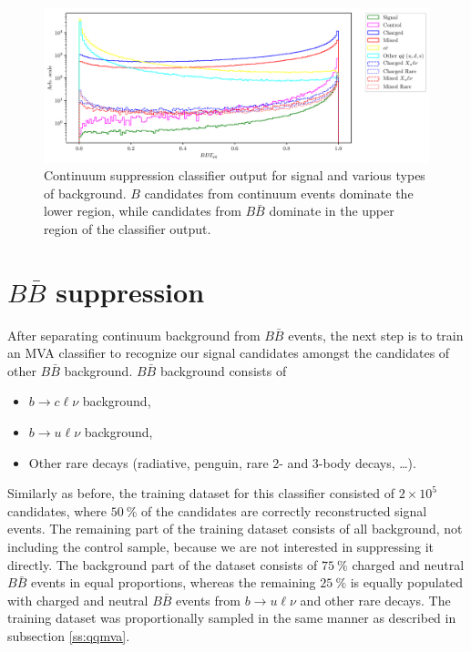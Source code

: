 \documentclass[headings=standardclasses,headings=big,oneside,a4paper,openany,12pt]{scrbook}
\newcommand {\E}[1]{\times 10^{#1}}
\begin{document}
\begin{figure}[H]
\centering
\captionsetup{width=0.8\linewidth}
\includegraphics[width=\linewidth]{fig/cs_BDT}
\caption{Continuum suppression classifier output for signal and various types of background. $B$ candidates from continuum events dominate the lower region, while candidates from $B\bar B$ dominate in the upper region of the classifier output.}
\label{fig:cs_mva}
\end{figure}

\section{$B\bar B$ suppression}

After separating continuum background from $B \bar B$ events, the next step is to train an MVA classifier to recognize our signal candidates amongst the candidates of other $B \bar B$ background. $B \bar B$ background consists of
\begin{itemize}
\item $b \to c \ell \nu$ background,
\item $b \to u \ell \nu$ background,
\item Other rare decays (radiative, penguin, rare 2- and 3-body decays, \dots).
\end{itemize}

Similarly as before, the training dataset for this classifier consisted of $2\E5$ candidates, where $50~\%$ of the candidates are correctly reconstructed signal events. The remaining part of the training dataset consists of all background, not including the control sample, because we are not interested in suppressing it directly. The background part of the dataset consists of $75~\%$ charged and neutral $B \bar B$ events in equal proportions, whereas the remaining $25~\%$ is equally populated with charged and neutral $B \bar B$ events from $b \to u \ell \nu$ and other rare decays. The training dataset was proportionally sampled in the same manner as described in subsection \ref{ss:qqmva}.
\end{document}
